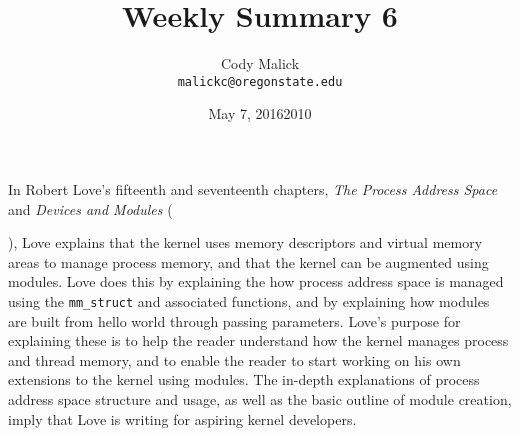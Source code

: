 \documentclass[10pt,letterpaper]{article}
\begin{document}
  \title{Weekly Summary 6}
  \author{Cody Malick\\
  \texttt{malickc@oregonstate.edu}}
  \date{May 7, 2016}
  \maketitle

    In Robert Love's fifteenth and seventeenth chapters, \textit{The Process Address Space}
    and \textit{Devices and Modules} (\date{2010}), Love explains
    that the kernel uses memory descriptors and virtual memory areas to manage
    process memory, and that the kernel can be augmented using modules.
    Love does this by explaining the how process address space is managed using the
    \texttt{mm\_struct} and associated functions, and by explaining how modules
    are built from hello world through passing parameters.
    Love's purpose for explaining these is to help the reader understand how
    the kernel manages process and thread memory, and to enable the reader
    to start working on his own extensions to the kernel using modules.
    The in-depth explanations of process address space structure and usage, as
    well as the basic outline of module creation, imply that Love is writing for
    aspiring kernel developers.
\end{document}
